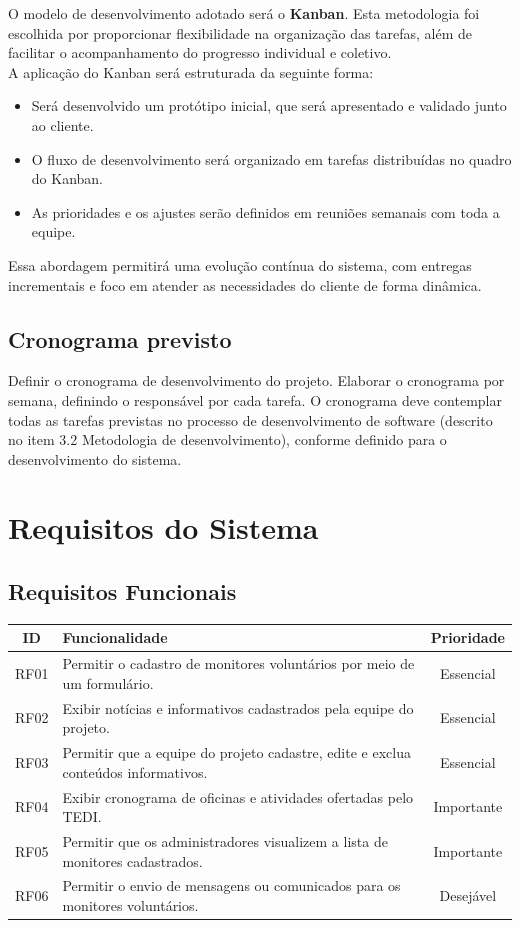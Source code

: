 \documentclass[a4paper,12pt]{article}
\begin{document}
O modelo de desenvolvimento adotado será o \textbf{Kanban}. Esta metodologia foi escolhida por proporcionar flexibilidade na organização das tarefas, além de facilitar o acompanhamento do progresso individual e coletivo.\\

A aplicação do Kanban será estruturada da seguinte forma:

\begin{itemize}
    \item Será desenvolvido um protótipo inicial, que será apresentado e validado junto ao cliente.
    \item O fluxo de desenvolvimento será organizado em tarefas distribuídas no quadro do Kanban.
    \item As prioridades e os ajustes serão definidos em reuniões semanais com toda a equipe.
\end{itemize}

Essa abordagem permitirá uma evolução contínua do sistema, com entregas incrementais e foco em atender as necessidades do cliente de forma dinâmica.


\subsection{Cronograma previsto}
Definir o cronograma de desenvolvimento do projeto. Elaborar o cronograma por semana, definindo o responsável por cada tarefa. O cronograma deve contemplar todas as tarefas previstas no processo de desenvolvimento de software (descrito no item 3.2 Metodologia de desenvolvimento), conforme definido para o desenvolvimento do sistema.

\newpage
\section{Requisitos do Sistema}
\subsection{Requisitos Funcionais}

\begin{longtable}{|c|p{10cm}|c|}
    \hline
    \textbf{ID} & \textbf{Funcionalidade} & \textbf{Prioridade} \\
    \hline
    RF01 & Permitir o cadastro de monitores voluntários por meio de um formulário. & Essencial \\
    \hline
    RF02 & Exibir notícias e informativos cadastrados pela equipe do projeto. & Essencial \\
    \hline
    RF03 & Permitir que a equipe do projeto cadastre, edite e exclua conteúdos informativos. & Essencial \\
    \hline
    RF04 & Exibir cronograma de oficinas e atividades ofertadas pelo TEDI. & Importante \\
    \hline
    RF05 & Permitir que os administradores visualizem a lista de monitores cadastrados. & Importante \\
    \hline
    RF06 & Permitir o envio de mensagens ou comunicados para os monitores voluntários. & Desejável \\
    \hline
\end{longtable}
\end{document}
